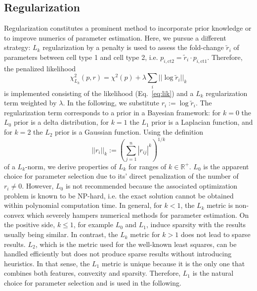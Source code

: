\documentclass{bioinfo}
\begin{document}
\subsection{Regularization}
Regularization constitutes a prominent method to incorporate prior knowledge or to improve numerics of parameter estimation.
Here, we pursue a different strategy:
$L_k$ regularization by a penalty is used to assess the fold-change $\tilde r_i$ of parameters between cell type 1 and cell type 2, i.e. $p_{i,\text{ct2}} = \tilde r_i \cdot p_{i,\text{ct1}}$.
Therefore, the penalized likelihood
\begin{equation}
\chi^2_{L_k}(p,r) = \chi^2(p) + \lambda \sum_i ||\log \tilde r_i||_k\label{eq:likreg}%
\end{equation}
is implemented consisting of the likelihood (Eq.~\ref{eq:lik}) and a $L_k$ regularization term weighted by $\lambda$.
In the following, we substitute $r_i := \log \tilde r_i$.
The regularization term corresponds to a prior in a Bayesian framework:
for $k=0$ the $L_0$ prior is a delta distribution, for $k=1$ the $L_1$ prior is a Laplacian function, and for $k=2$ the $L_2$ prior is a Gaussian function.
Using the definition
\begin{equation}
||r_i||_k := {\left( \sum_{j=1}^n |r_{ij}|^k \right)}^{1/k}\label{eq:norm}%
\end{equation}
of a $L_k$-norm, we derive properties of $L_k$ for ranges of $k\in \mathbb R^+$.
$L_0$ is the apparent choice for parameter selection due to its' direct penalization of the number of $r_i \neq 0$.
However, $L_0$ is not recommended because the associated optimization problem is known to be NP-hard, i.e. the exact solution cannot be obtained within polynomial computation time.
In general, for $k<1$, the $L_k$ metric is non-convex which severely hampers numerical methods for parameter estimation.
On the positive side, $k\leq1$, for example $L_0$ and $L_1$, induce sparsity with the results usually being similar.
In contrast, the $L_k$ metric for $k>1$ does not lead to sparse results.
$L_2$, which is the metric used for the well-known least squares, can be handled efficiently but does not produce sparse results without introducing heuristics.
In that sense, the $L_1$ metric is unique because it is the only one that combines both features, convexity and sparsity.
Therefore, $L_1$ is the natural choice for parameter selection and is used in the following.
\end{document}
